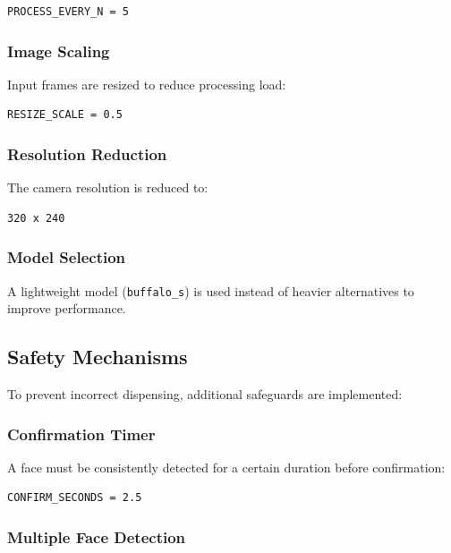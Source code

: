 \begin{verbatim}
PROCESS_EVERY_N = 5
\end{verbatim}

\subsubsection{Image Scaling}

Input frames are resized to reduce processing load:

\begin{verbatim}
RESIZE_SCALE = 0.5
\end{verbatim}

\subsubsection{Resolution Reduction}

The camera resolution is reduced to:

\begin{verbatim}
320 x 240
\end{verbatim}

\subsubsection{Model Selection}

A lightweight model (\texttt{buffalo\_s}) is used instead of heavier alternatives to improve performance.

\subsection{Safety Mechanisms}

To prevent incorrect dispensing, additional safeguards are implemented:

\subsubsection{Confirmation Timer}

A face must be consistently detected for a certain duration before confirmation:

\begin{verbatim}
CONFIRM_SECONDS = 2.5
\end{verbatim}

\subsubsection{Multiple Face Detection}

